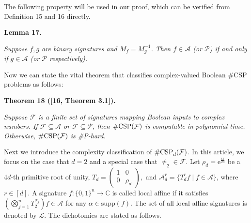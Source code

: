\documentclass[10pt,a4paper]{article}
\begin{document}



The following property will be used in our proof, which can be verified from Definition 15
and 16 directly.\par





\par\medskip\noindent\textbf{
\textbf{Lemma 17}\textbf{.}
}\par



\emph{Suppose $f,g$ are binary signatures and $M_{f}=M_{g}^{-1}$. Then $f\in\mathscr{A}$ (or $\mathscr{P}$) if and only if $g\in\mathscr{A}$ (or $\mathscr{P}$ respectively).}\par






Now we can state the vital theorem that classifies complex-valued Boolean \#CSP problems as follows:\par





\par\medskip\noindent\textbf{
\textbf{Theorem 18}\textbf{ }([16, Theorem 3.1])\textbf{.}
}\par



\emph{Suppose $\mathcal{F}$ is a finite set of signatures mapping Boolean inputs to complex numbers. If $\mathcal{F}\subseteq\mathscr{A}$ or $\mathcal{F}\subseteq\mathscr{P}$, then $\#\textup{{CSP}}(\mathcal{F})$ is computable in polynomial time. Otherwise, $\#\textup{{CSP}}(\mathcal{F})$ is \#P-hard.}\par






Next we introduce the complexity classification of $\textup{{\#CSP}}_{d}(\mathcal{F})$. In this article, we focus on the case that $d=2$ and a special case that $\neq_{2}\in\mathcal{F}$. Let $\rho_{d}=\text{e}^{\frac{i\pi}{2d}}$ be a $4d$-th primitive root of unity, $T_{d}=\begin{pmatrix}1&0\\
0&\rho_{d}\end{pmatrix},$ and $\mathscr{A}_{d}^{r}=\{T_{d}^{r}f\mid f\in\mathscr{A}\}$, where $r\in[d]$.
A signature $f:\{0,1\}^{n}\rightarrow\mathbb{C}$ is called local affine if it satisfies $(\bigotimes_{j=1}^{n}T_{2}^{\alpha_{j}})f\in\mathscr{A}$ for any $\alpha\in\text{supp}(f)$. The set of all local affine signatures is denoted by $\mathscr{L}$. The dichotomies are stated as follows.\par
\end{document}

